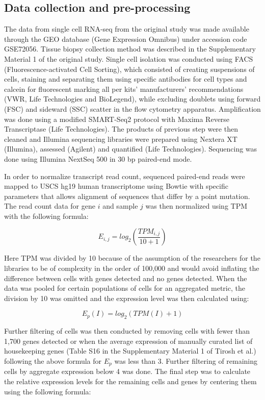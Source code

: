 \documentclass[11pt]{article}
\begin{document}
\subsection{Data collection and pre-processing}
\begin{multicols}{2}
    \noindent
    The data from single cell RNA-seq from the original study was made available through the GEO database (Gene Expression Omnibus)\cite{barrett_ncbi_2013} under accession code GSE72056\cite{noauthor_geo_nodate}. Tissue biopsy collection method was described in the Supplementary Material 1 of the original study. Single cell isolation was conducted using FACS (Fluorescence-activated Cell Sorting), which consisted of creating suspensions of cells, staining and separating them using specific antibodies for cell types and calcein for fluorescent marking all per kits' manufacturers' recommendations (VWR, Life Technologies and BioLegend), while excluding doublets using forward (FSC) and sideward (SSC) scatter in the flow cytometry apparatus. Amplification was done using a modified SMART-Seq2 protocol with Maxima Reverse Transcriptase (Life Technologies). The products of previous step were then cleaned and Illumina sequencing libraries were prepared using Nextera XT (Illumina), assessed (Agilent) and quantified (Life Technologies). Sequencing was done using Illumina NextSeq 500 in 30 bp paired-end mode.

    In order to normalize transcript read count, sequenced paired-end reads were mapped to USCS hg19 human transcriptome using Bowtie with specific parameters that allows alignment of sequences that differ by a point mutation. The read count data for gene $i$ and sample $j$ was then normalized using TPM with the following formula:

    $$E_{i,j} = log_2 (\frac{TPM_{i,j}}{10 + 1})$$

    Here TPM was divided by 10 because of the assumption of the researchers for the libraries to be of complexity in the order of 100,000 and would avoid inflating the difference between cells with genes detected and no genes detected. When the data was pooled for certain populations of cells for an aggregated metric, the division by 10 was omitted and the expression level was then calculated using:

    $$E_p(I)=log_2(TPM(I)+1)$$

    Further filtering of cells was then conducted by removing cells with fewer than 1,700 genes detected or when the average expression of manually curated list of housekeeping genes (Table S16 in the Supplementary Material 1 of Tirosh et al.\cite{tirosh_dissecting_2016}) following the above formula for $E_p$ was less than 3. Further filtering of remaining cells by aggregate expression below 4 was done. The final step was to calculate the relative expression levels for the remaining cells and genes by centering them using the following formula:


\end{multicols}
\end{document}

